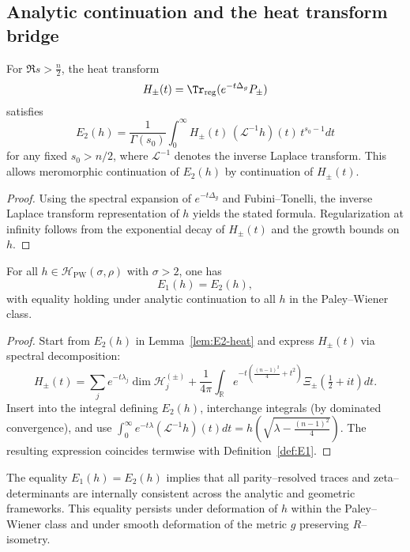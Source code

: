 \subsection{Analytic continuation and the heat transform bridge}
\label{subsec:ch6-part3-heat-transform} \relax

\begin{lemma}
\label{lem:E2-heat}
For $\Re s>\tfrac{n}{2}$, the heat transform
\[
H_\pm(t)=\Tr_{\mathrm{reg}}(e^{-t\Delta_g}P_\pm)
\]
satisfies
\[
E_2(h)=\frac{1}{\Gamma(s_0)}\int_0^\infty H_\pm(t)\,(\mathcal{L}^{-1}h)(t)\,t^{s_0-1}dt
\]
for any fixed $s_0>n/2$, where $\mathcal{L}^{-1}$ denotes the inverse Laplace transform.  
This allows meromorphic continuation of $E_2(h)$ by continuation of $H_\pm(t)$. %
\end{lemma}

\begin{proof}
Using the spectral expansion of $e^{-t\Delta_g}$ and Fubini–Tonelli, the inverse Laplace transform representation of $h$ yields the stated formula.  
Regularization at infinity follows from the exponential decay of $H_\pm(t)$ and the growth bounds on $h$. %
\end{proof}

\begin{theorem}[Analytic equivalence $E_1(h)=E_2(h)$]
\label{thm:E1E2}
For all $h\in\mathcal{H}_{\mathrm{PW}}(\sigma,\rho)$ with $\sigma>2$, one has
\[
E_1(h)=E_2(h),
\]
with equality holding under analytic continuation to all $h$ in the Paley–Wiener class. %
\end{theorem}

\begin{proof}
Start from $E_2(h)$ in Lemma~\ref{lem:E2-heat} and express $H_\pm(t)$ via spectral decomposition:
\[
H_\pm(t)
=\sum_j e^{-t\lambda_j}\dim \mathcal{H}_j^{(\pm)}
+\frac{1}{4\pi}\int_{\mathbb{R}} e^{-t(\frac{(n-1)^2}{4}+t^2)} \Xi_\pm\!\left(\tfrac{1}{2}+it\right)dt.
\]
Insert into the integral defining $E_2(h)$, interchange integrals (by dominated convergence), and use $\int_0^\infty e^{-t\lambda}(\mathcal{L}^{-1}h)(t)dt=h(\sqrt{\lambda-\tfrac{(n-1)^2}{4}})$.  
The resulting expression coincides termwise with Definition~\ref{def:E1}. %
\end{proof}

\begin{remark}
\label{rem:closure}
The equality $E_1(h)=E_2(h)$ implies that all parity–resolved traces and zeta–determinants are internally consistent across the analytic and geometric frameworks.  
This equality persists under deformation of $h$ within the Paley–Wiener class and under smooth deformation of the metric $g$ preserving $R$–isometry. %
\end{remark}

